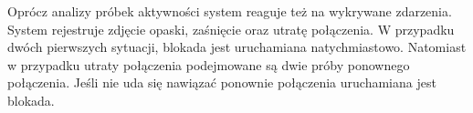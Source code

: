 \newline\newline
\indent Oprócz analizy próbek aktywności system reaguje też na wykrywane zdarzenia. System rejestruje zdjęcie opaski, zaśnięcie oraz utratę połączenia. W przypadku dwóch pierwszych sytuacji, blokada jest uruchamiana natychmiastowo. Natomiast w przypadku utraty połączenia podejmowane są dwie próby ponownego połączenia. Jeśli nie uda się nawiązać ponownie połączenia uruchamiana jest blokada.